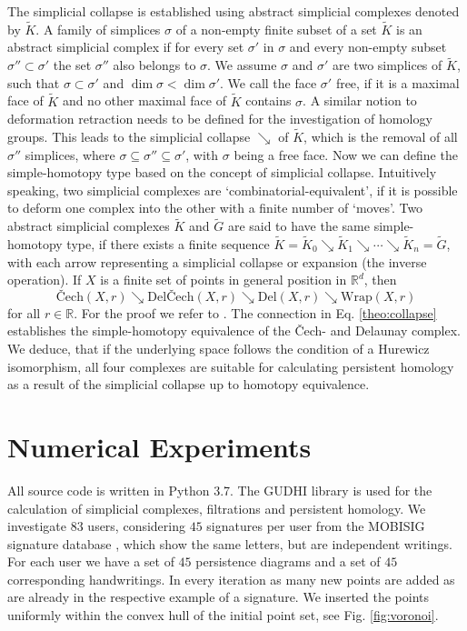 \documentclass[runningheads]{llncs}
\begin{document}
The simplicial collapse is established using abstract simplicial complexes denoted by $\tilde{K}$. A family of simplices $\sigma$ of a non-empty finite subset of a set $\tilde{K}$ is an abstract simplicial complex if for every set $\sigma'$ in $\sigma$ and every non-empty subset $\sigma'' \subset \sigma'$ the set $\sigma''$ also belongs to $\sigma$. We assume $\sigma$ and $\sigma'$ are two simplices of $\tilde{K}$, such that $\sigma \subset \sigma'$ and $\dim \sigma < \dim \sigma'$. We call the face $\sigma'$ free, if it is a maximal face of $\tilde{K}$ and no other maximal face of $\tilde{K}$ contains $\sigma$. A similar notion to deformation retraction needs to be defined for the investigation of homology groups. This leads to the simplicial collapse $\searrow$ of $\tilde{K}$, which is the removal of all $\sigma''$ simplices, where $\sigma \subseteq \sigma'' \subseteq \sigma'$, with $\sigma$ being a free face. Now we can define the simple-homotopy type based on the concept of simplicial collapse. Intuitively speaking, two simplicial complexes are `combinatorial-equivalent', if it is possible to deform one complex into the other with a finite number of `moves'.  Two abstract simplicial complexes $\tilde{K}$ and $\tilde{G}$ are said to have the same simple-homotopy type, if there exists a finite sequence $\tilde{K}=\tilde{K}_0 \searrow \tilde{K}_1 \searrow \cdots \searrow \tilde{K}_n = \tilde{G}$, with each arrow representing a simplicial collapse or expansion (the inverse operation). If $X$ is a finite set of points in general position in $\mathbb{R}^d$, then
\begin{equation}
\label{theo:collapse}
\text{\v{C}ech}(X,r) \searrow \text{Del\v{C}ech}(X,r) \searrow \text{Del}(X,r) \searrow \text{Wrap}(X,r)
\end{equation}
for all $r \in \mathbb{R}$. For the proof we refer to \cite{bauer2017morse}. The connection in Eq. \ref{theo:collapse} establishes the simple-homotopy equivalence of the \v{C}ech- and Delaunay complex. We deduce, that if the underlying space follows the condition of a Hurewicz isomorphism, all four complexes are suitable for calculating persistent homology as a result of the simplicial collapse up to homotopy equivalence.

\section{Numerical Experiments}
\label{sec:numexp}

All source code is written in Python 3.7. The GUDHI \cite{gudhi:urm} library is used for the calculation of simplicial complexes, filtrations and persistent homology. We investigate $83$ users, considering $45$ signatures per user from the MOBISIG signature database \cite{MOBISIG}, which show the same letters, but are independent writings. For each user we have a set of $45$ persistence diagrams and a set of $45$ corresponding handwritings. In every iteration as many new points are added as are already in the respective example of a signature. We inserted the points uniformly within the convex hull of the initial point set, see Fig. \ref{fig:voronoi}.
\end{document}
